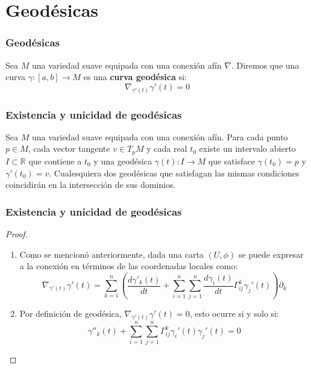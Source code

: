 \section{Geodésicas}

\begin{frame}
	\frametitle{Geodésicas}
	\begin{definition}
		Sea $M$ una variedad suave equipada con una conexión afín $\nabla$. Diremos que una curva $\gamma: [a,b] \to M$ es una \textbf{curva geodésica} si:
		\[
			\nabla_{\gamma'(t)} \gamma'(t) = 0
		\]
	\end{definition}
\end{frame}

\begin{frame}
	\frametitle{Existencia y unicidad de geodésicas}
	\begin{theorem}
		Sea $M$ una variedad suave equipada con una conexión afín. Para cada punto $p \in M$, cada vector tangente $v \in T_{p}M$ y cada real $t_0$ existe un intervalo abierto $I \subset \mathbb{R} $ que contiene a $t_0$ y una geodésica $\gamma(t) : I \to M $ que satisface $\gamma(t_0) = p$ y $\gamma'(t_0) = v$. \pause Cualesquiera dos geodésicas que satisfagan las mismas condiciones coincidirán en la intersección de sus dominios.
	\end{theorem}

\end{frame}

\begin{frame}
	\frametitle{Existencia y unicidad de geodésicas}
	\begin{proof}
		\begin{enumerate}
			\item Como se mencionó anteriormente, dada una carta $(U,\phi)$ se puede expresar a la conexión en términos de las coordenadas locales como:
			      \[
				      \nabla_{\gamma'(t)}\gamma'(t) = \sum_{k=1}^{n} \left(
				      \frac{d\gamma'_k(t)}{dt} + \sum_{i=1}^{n}\sum_{j=1}^{n} \frac{d\gamma_{i}(t)}{dt} \Gamma_{ij}^{k}\gamma_{j}'(t)
				      \right) \partial_{k}			      \] \pause
			\item Por definición de geodésica, $\nabla_{\gamma'(t)}\gamma'(t) = 0$, esto ocurre si y solo si:
			      \[
				      \gamma''_{k}(t) + \sum_{i=1}^{n}\sum_{j=1}^{n} \Gamma_{ij}^{k}\gamma_{i}'(t) \gamma_{j}'(t) = 0
			      \]
		\end{enumerate}
	\end{proof}
\end{frame}


